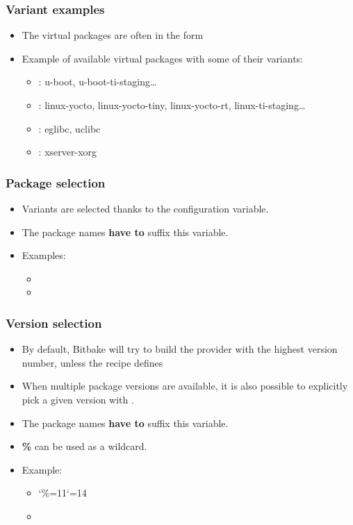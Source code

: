 \begin{frame}
  \frametitle{Variant examples}
  \begin{itemize}
    \item The virtual packages are often in the form
    \item Example of available virtual packages with some of their
      variants:
      \begin{itemize}
        \item {}: u-boot,
          u-boot-ti-staging\dots
        \item {}: linux-yocto, linux-yocto-tiny,
          linux-yocto-rt, linux-ti-staging\dots
        \item {}: eglibc, uclibc
        \item {}: xserver-xorg
      \end{itemize}
  \end{itemize}
\end{frame}

\begin{frame}
  \frametitle{Package selection}
  \begin{itemize}
    \item Variants are selected thanks to the
       configuration variable.
    \item The package names {\bf have to} suffix this variable.
    \item Examples:
    \begin{itemize}
      \item {}
      \item {}
    \end{itemize}
  \end{itemize}
\end{frame}

\begin{frame}
  \frametitle{Version selection}
  \begin{itemize}
    \item By default, Bitbake will try to build the provider with the
      highest version number, unless the recipe defines
    \item When multiple package versions are available, it is also
      possible to explicitly pick a given version with
      .
    \item The package names {\bf have to} suffix this variable.
    \item {\bf \%} can be used as a wildcard.
    \item Example:
    \begin{itemize}
      \item \catcode`\%=11\catcode`\@=14
      \item {}
    \end{itemize}
  \end{itemize}
\end{frame}

